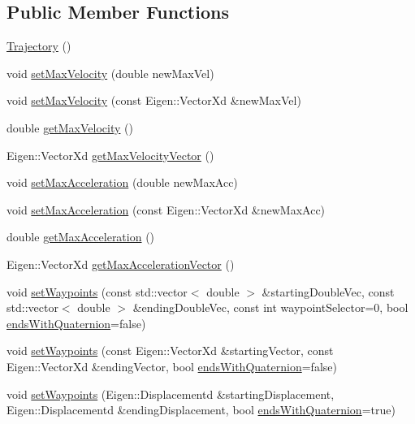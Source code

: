 \subsection*{Public Member Functions}
\begin{DoxyCompactItemize}
\item 
\hyperlink{classocra_1_1Trajectory_a0188adbc4ad9608302303dc4615ebecb}{Trajectory} ()
\item 
void \hyperlink{classocra_1_1Trajectory_a12e4348201fbdc32d34ce1627d6da1fd}{set\+Max\+Velocity} (double new\+Max\+Vel)
\item 
void \hyperlink{classocra_1_1Trajectory_accba854a05f9b17859c0a7f2e0820958}{set\+Max\+Velocity} (const Eigen\+::\+Vector\+Xd \&new\+Max\+Vel)
\item 
double \hyperlink{classocra_1_1Trajectory_a2c7cba3382416e42cbf7a931b8c9e0ef}{get\+Max\+Velocity} ()
\item 
Eigen\+::\+Vector\+Xd \hyperlink{classocra_1_1Trajectory_a8cdf985ffe59a3d00f7967035f79376d}{get\+Max\+Velocity\+Vector} ()
\item 
void \hyperlink{classocra_1_1Trajectory_a617400d2591ef575f20ca2b431151ace}{set\+Max\+Acceleration} (double new\+Max\+Acc)
\item 
void \hyperlink{classocra_1_1Trajectory_a0fa531fd1f33f142a7d1b3324a478cb9}{set\+Max\+Acceleration} (const Eigen\+::\+Vector\+Xd \&new\+Max\+Acc)
\item 
double \hyperlink{classocra_1_1Trajectory_ab86e41d3a59f9e9f9b06bf43928f7552}{get\+Max\+Acceleration} ()
\item 
Eigen\+::\+Vector\+Xd \hyperlink{classocra_1_1Trajectory_aaa40e685df5caf6f4d81d08b47d82301}{get\+Max\+Acceleration\+Vector} ()
\item 
void \hyperlink{classocra_1_1Trajectory_af8ae6008824f92f5de31edf0944f4fbd}{set\+Waypoints} (const std\+::vector$<$ double $>$ \&starting\+Double\+Vec, const std\+::vector$<$ double $>$ \&ending\+Double\+Vec, const int waypoint\+Selector=0, bool \hyperlink{classocra_1_1Trajectory_a4f230978860de9473f83df3b8ae31ad9}{ends\+With\+Quaternion}=false)
\item 
void \hyperlink{classocra_1_1Trajectory_a941a5f6357d5ee707d703357eb525d6e}{set\+Waypoints} (const Eigen\+::\+Vector\+Xd \&starting\+Vector, const Eigen\+::\+Vector\+Xd \&ending\+Vector, bool \hyperlink{classocra_1_1Trajectory_a4f230978860de9473f83df3b8ae31ad9}{ends\+With\+Quaternion}=false)
\item 
void \hyperlink{classocra_1_1Trajectory_a8d9de492efb89ff6a05f66c2498fd5e6}{set\+Waypoints} (Eigen\+::\+Displacementd \&starting\+Displacement, Eigen\+::\+Displacementd \&ending\+Displacement, bool \hyperlink{classocra_1_1Trajectory_a4f230978860de9473f83df3b8ae31ad9}{ends\+With\+Quaternion}=true)

\end{DoxyCompactItemize}
